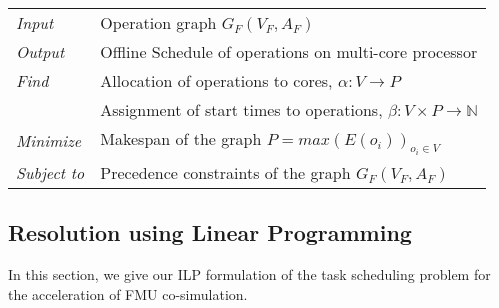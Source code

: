 \begin{table}[h]
\centering
\begin{tabular}{l  l}
  \rule{0pt}{5ex}	
	\textit{Input} & Operation graph $G_F(V_F,A_F)$\\
	\rule{0pt}{5ex}									  
	
  \textit{Output} & Offline Schedule of operations on multi-core processor\\
	\rule{0pt}{5ex}									  
  
	\textit{Find} & Allocation of operations to cores, $\alpha: V \rightarrow P$\\
	\rule{0pt}{5ex}
                & Assignment of start times to operations, $\beta: V \times P \rightarrow \mathbb{N}$\\
	\rule{0pt}{5ex}
	
	\textit{Minimize} & Makespan of the graph $P = max(E(o_i))_{o_i \in V}$\\
	\rule{0pt}{5ex}									 
	
	\textit{Subject to} & Precedence constraints of the graph $G_F(V_F,A_F)$\\
										 
	
\end{tabular}
\end{table}

\subsection{Resolution using Linear Programming}

In this section, we give our ILP formulation of the task scheduling problem for the acceleration of FMU co-simulation.

